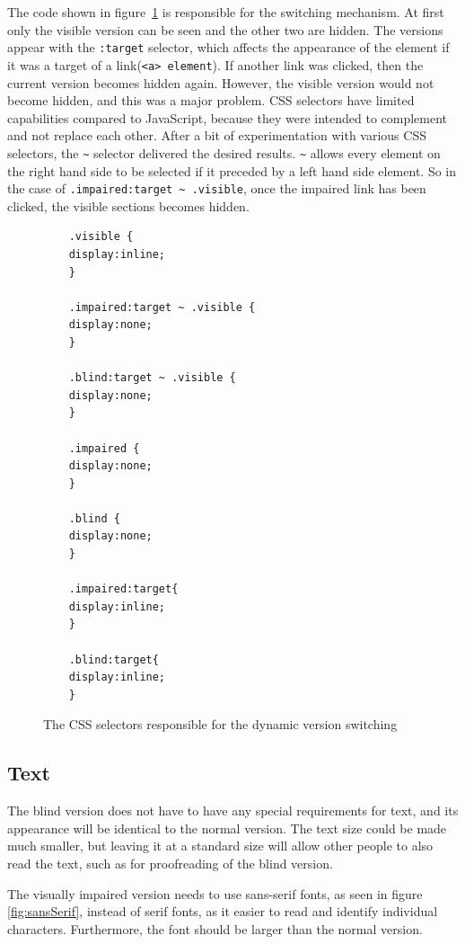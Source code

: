 The code shown in figure~\ref{fig:css_selector} is responsible for the switching mechanism. At first only the visible version can be seen and the other two are hidden. The versions appear with the \lstinline|:target| selector, which affects the appearance of the element if it was a target of a link(\lstinline|<a> element|). If another link was clicked, then the current version becomes hidden again. However, the visible version would not become hidden, and this was a major problem. CSS selectors have limited capabilities compared to JavaScript, because they were intended to complement and not replace each other. After a bit of experimentation with various CSS selectors, the \lstinline|~| selector delivered the desired results. \lstinline|~| allows every element on the right hand side to be selected if it preceded by a left hand side element. So in the case of \lstinline|.impaired:target ~ .visible|, once the impaired link has been clicked, the visible sections becomes hidden.

\begin{figure}
	
	\begin{lstlisting}
	.visible {
	display:inline; 
	}
	
	.impaired:target ~ .visible {
	display:none; 
	}
	
	.blind:target ~ .visible {
	display:none; 
	}
	
	.impaired {
	display:none; 
	}
	
	.blind {
	display:none; 
	}
	
	.impaired:target{
	display:inline; 
	}
	
	.blind:target{
	display:inline; 
	}
	\end{lstlisting}
	\caption{The CSS selectors responsible for the dynamic version switching}
	\label{fig:css_selector}
\end{figure}

\subsection{Text}

The blind version does not have to have any special requirements for text, and its appearance will be identical to the normal version. The text size could be made much smaller, but leaving it at a standard size will allow other people to also read the text, such as for proofreading of the blind version.

The visually impaired version needs to use sans-serif fonts, as seen in figure \ref{fig:sansSerif}, instead of serif fonts, as it easier to read and identify individual characters.\cite{pdfBarrierefrei} Furthermore, the font should be larger than the normal version. 


